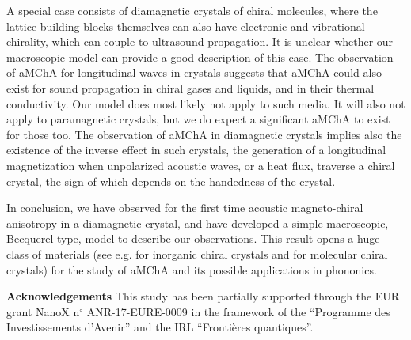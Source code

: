 \documentclass[prl,twocolumn]{revtex4-2}
\begin{document}
A special case consists of diamagnetic crystals of chiral molecules, where
the lattice building blocks themselves can also have electronic and
vibrational chirality, which can couple to ultrasound propagation. It is
unclear whether our macroscopic model can provide a good description of this
case. The observation of aMChA for longitudinal waves in crystals suggests
that aMChA could also exist for sound propagation in chiral gases and
liquids, and in their thermal conductivity. Our model does most likely not
apply to such media. It will also not apply to paramagnetic crystals, but we
do expect a significant aMChA to exist for those too. The observation of
aMChA in diamagnetic crystals implies also the existence of the inverse
effect in such crystals, the generation of a longitudinal magnetization when
unpolarized acoustic waves, or a heat flux, traverse a chiral crystal, the
sign of which depends on the handedness of the crystal.

In conclusion, we have observed for the first time acoustic magneto-chiral
anisotropy in a diamagnetic crystal, and have developed a simple
macroscopic, Becquerel-type, model to describe our observations. This result
opens a huge class of materials (see e.g. \cite{Chiral-phonon-database} for
inorganic chiral crystals and \cite{Rekis} for molecular chiral crystals)
for the study of aMChA and its possible applications in phononics.

\textbf{Acknowledgements} This study has been partially supported through
the EUR grant NanoX n$^\circ$ ANR-17-EURE-0009 in the framework of the
``Programme des Investissements d'Avenir'' and the IRL ``Fronti\`{e}res
quantiques''.
\end{document}
